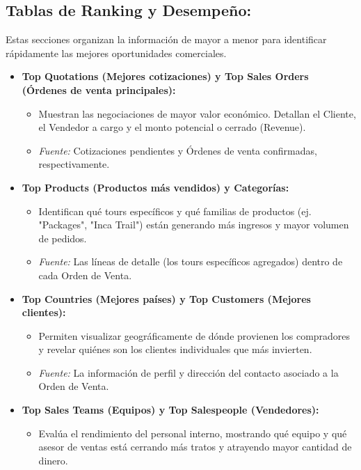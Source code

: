 \documentclass[11pt,a4paper]{article}
\begin{document}
\subsection*{Tablas de Ranking y Desempeño:}
Estas secciones organizan la información de mayor a menor para identificar rápidamente las mejores oportunidades comerciales.

\begin{itemize}[leftmargin=*]
    \item \textbf{Top Quotations (Mejores cotizaciones) y Top Sales Orders (Órdenes de venta principales):}
    \begin{itemize}
        \item Muestran las negociaciones de mayor valor económico. Detallan el Cliente, el Vendedor a cargo y el monto potencial o cerrado (Revenue).
        \item \textit{Fuente:} Cotizaciones pendientes y Órdenes de venta confirmadas, respectivamente.
    \end{itemize}
    \item \textbf{Top Products (Productos más vendidos) y Categorías:}
    \begin{itemize}
        \item Identifican qué tours específicos y qué familias de productos (ej. "Packages", "Inca Trail") están generando más ingresos y mayor volumen de pedidos.
        \item \textit{Fuente:} Las líneas de detalle (los tours específicos agregados) dentro de cada Orden de Venta.
    \end{itemize}
    \item \textbf{Top Countries (Mejores países) y Top Customers (Mejores clientes):}
    \begin{itemize}
        \item Permiten visualizar geográficamente de dónde provienen los compradores y revelar quiénes son los clientes individuales que más invierten.
        \item \textit{Fuente:} La información de perfil y dirección del contacto asociado a la Orden de Venta.
    \end{itemize}
    \item \textbf{Top Sales Teams (Equipos) y Top Salespeople (Vendedores):}
    \begin{itemize}
        \item Evalúa el rendimiento del personal interno, mostrando qué equipo y qué asesor de ventas está cerrando más tratos y atrayendo mayor cantidad de dinero.

\end{itemize}
\end{itemize}
\end{document}
